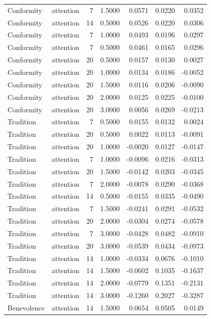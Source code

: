 \begin{tabular}{llrrrrr}
Conformity & attention & 7 & 1.5000 & 0.0571 & 0.0220 & 0.0352 \\
Conformity & attention & 14 & 0.5000 & 0.0526 & 0.0220 & 0.0306 \\
Conformity & attention & 7 & 1.0000 & 0.0493 & 0.0196 & 0.0297 \\
Conformity & attention & 7 & 0.5000 & 0.0461 & 0.0165 & 0.0296 \\
Conformity & attention & 20 & 0.5000 & 0.0157 & 0.0130 & 0.0027 \\
Conformity & attention & 20 & 1.0000 & 0.0134 & 0.0186 & -0.0052 \\
Conformity & attention & 20 & 1.5000 & 0.0116 & 0.0206 & -0.0090 \\
Conformity & attention & 20 & 2.0000 & 0.0125 & 0.0225 & -0.0100 \\
Conformity & attention & 20 & 3.0000 & 0.0056 & 0.0269 & -0.0213 \\
Tradition & attention & 7 & 0.5000 & 0.0155 & 0.0132 & 0.0024 \\
Tradition & attention & 20 & 0.5000 & 0.0022 & 0.0113 & -0.0091 \\
Tradition & attention & 20 & 1.0000 & -0.0020 & 0.0127 & -0.0147 \\
Tradition & attention & 7 & 1.0000 & -0.0096 & 0.0216 & -0.0313 \\
Tradition & attention & 20 & 1.5000 & -0.0142 & 0.0203 & -0.0345 \\
Tradition & attention & 7 & 2.0000 & -0.0078 & 0.0290 & -0.0368 \\
Tradition & attention & 14 & 0.5000 & -0.0155 & 0.0335 & -0.0490 \\
Tradition & attention & 7 & 1.5000 & -0.0241 & 0.0291 & -0.0532 \\
Tradition & attention & 20 & 2.0000 & -0.0304 & 0.0274 & -0.0578 \\
Tradition & attention & 7 & 3.0000 & -0.0428 & 0.0482 & -0.0910 \\
Tradition & attention & 20 & 3.0000 & -0.0539 & 0.0434 & -0.0973 \\
Tradition & attention & 14 & 1.0000 & -0.0334 & 0.0676 & -0.1010 \\
Tradition & attention & 14 & 1.5000 & -0.0602 & 0.1035 & -0.1637 \\
Tradition & attention & 14 & 2.0000 & -0.0779 & 0.1351 & -0.2131 \\
Tradition & attention & 14 & 3.0000 & -0.1260 & 0.2027 & -0.3287 \\
Benevolence & attention & 14 & 1.5000 & 0.0654 & 0.0505 & 0.0149 \\

\end{tabular}
